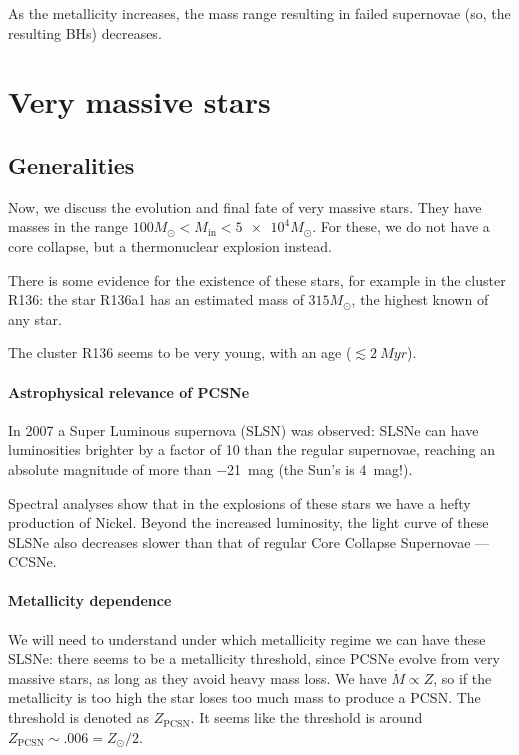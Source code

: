 \documentclass[main.tex]{subfiles}
\begin{document}
As the metallicity increases, the mass range resulting in failed supernovae (so, the resulting BHs) decreases. 

\section{Very massive stars}

\subsection{Generalities}

Now, we discuss the evolution and final fate of very massive stars. 
They have masses in the range \(100 M_{\odot} < M _{\text{in}} < \num{5e4}M_{\odot}\). 
For these, we do not have a core collapse, but a thermonuclear explosion instead. 

There is some evidence for the existence of these stars, for example in the cluster R136: the star R136a1 has an estimated mass of \(315M_{\odot}\), the highest known of any star. 

The cluster R136 seems to be very young, with an age (\(\lesssim \SI{2}{Myr}\)). 

\paragraph{Astrophysical relevance of PCSNe}

In 2007 a Super Luminous supernova (SLSN) was observed: SLSNe can have luminosities brighter by a factor of 10 than the regular supernovae, reaching an absolute magnitude of more than \SI{-21}{mag} (the Sun's is \SI{4}{mag}!). 

Spectral analyses show that in the explosions of these stars we have a hefty production of Nickel.
Beyond the increased luminosity, the light curve of these SLSNe also decreases slower than that of regular Core Collapse Supernovae --- CCSNe.

\paragraph{Metallicity dependence}

We will need to understand under which metallicity regime we can have these SLSNe: there seems to be a metallicity threshold, since PCSNe evolve from very massive stars, as long as they avoid heavy mass loss. 
We have \(\dot{M} \propto Z\), so if the metallicity is too high the star loses too much mass to produce a PCSN. The threshold is denoted as \(Z _{\text{PCSN}}\).
It seems like the threshold is around \(Z _{\text{PCSN}}\sim \num{.006} = Z_{\odot} / 2\).
\end{document}
